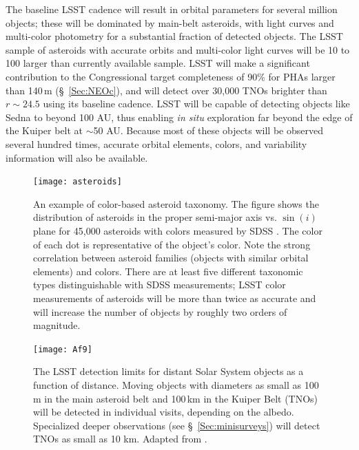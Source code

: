 The baseline LSST cadence will result in orbital parameters for several
million objects; these will be dominated by main-belt asteroids, with
light curves and multi-color photometry for a substantial fraction of detected objects.
The LSST sample of asteroids with accurate orbits and multi-color light curves
will be 10 to 100 larger than currently available sample.
LSST will make a significant contribution to the Congressional target
completeness of 90\% for PHAs larger than 140\,m (\S~\ref{Sec:NEOc}), and will detect over 30,000 TNOs brighter than $r\sim24.5$ using its baseline cadence. LSST will be capable
of detecting objects like Sedna to beyond 100 AU, thus enabling \textit{in situ} exploration
far beyond the edge of the Kuiper belt at $\sim$50 AU. Because most of these
objects will be observed several hundred times, accurate orbital elements,
colors, and variability information will also be available.


\begin{figure}
\texttt{[image: asteroids]}
\caption{An example of color-based asteroid taxonomy. The figure
shows the distribution of asteroids in the proper semi-major axis vs. $\sin(i)$
plane for 45,000 asteroids with colors measured by SDSS \citep{2008Icar..198..138P}.
The color of each dot is representative of the object's color.
Note the strong correlation between asteroid families (objects with
similar orbital elements) and colors. There are
at least five different taxonomic types distinguishable with SDSS measurements;
LSST color measurements of asteroids will be more than twice as accurate
and will increase the number of objects by roughly two orders of magnitude.}
\label{Fig:asteroids}
\end{figure}

\begin{figure}
\texttt{[image: Af9]}
\caption{The LSST detection limits for distant Solar System objects as
  a function of distance.
Moving objects with diameters as small as 100\,m in the main asteroid belt and
100\,km in the Kuiper Belt (TNOs) will be detected in individual visits,
depending on the albedo. Specialized deeper observations
(see \S~\ref{Sec:minisurveys}) will detect TNOs as small as 10 km. Adapted from
\citet{2007AAS...21113714J}.}
\label{Fig:Af9}
\end{figure}



